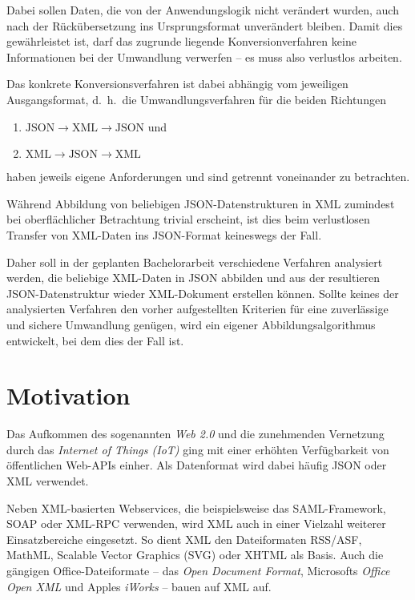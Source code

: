 \documentclass[conference]{template/IEEEtran}
\begin{document}
Dabei sollen Daten, die von der Anwendungslogik nicht verändert wurden, auch
nach der Rückübersetzung ins Ursprungsformat unverändert bleiben. Damit dies
gewährleistet ist, darf das zugrunde liegende Konversionverfahren keine
Informationen bei der Umwandlung verwerfen -- es muss also verlustlos %
arbeiten.

Das konkrete Konversionsverfahren ist dabei abhängig vom jeweiligen
Ausgangsformat, d.~h.\ die Umwandlungsverfahren für die beiden Richtungen
\begin{enumerate}
    \item $\text{JSON} \rightarrow \text{XML} \rightarrow \text{JSON}$ und
    \item $\text{XML} \rightarrow \text{JSON} \rightarrow \text{XML}$
\end{enumerate}
haben jeweils eigene Anforderungen und sind getrennt voneinander zu betrachten.

Während Abbildung von beliebigen JSON-Datenstrukturen in XML zumindest bei
oberflächlicher Betrachtung trivial erscheint, ist dies beim verlustlosen
Transfer von XML-Daten ins JSON-Format keineswegs der Fall.

Daher soll in der geplanten Bachelorarbeit verschiedene Verfahren analysiert
werden, die beliebige XML-Daten in JSON abbilden und aus der resultieren
JSON-Datenstruktur wieder XML-Dokument erstellen können. Sollte keines
der analysierten Verfahren den vorher aufgestellten Kriterien für eine
zuverlässige und sichere Umwandlung genügen, wird ein eigener
Abbildungsalgorithmus entwickelt, bei dem dies der Fall ist.

\section{Motivation}
\label{sec:motivation}
Das Aufkommen des sogenannten \emph{Web 2.0} und die zunehmenden Vernetzung
durch das \emph{Internet of Things (IoT)} ging mit einer erhöhten
Verfügbarkeit von öffentlichen Web-APIs einher. Als Datenformat wird dabei
häufig JSON oder XML verwendet.

Neben XML-basierten Webservices, die beispielsweise das SAML-Framework, SOAP
oder XML-RPC verwenden, wird XML auch in einer Vielzahl weiterer
Einsatzbereiche eingesetzt. So dient XML den Dateiformaten RSS/ASF, MathML,
Scalable Vector Graphics (SVG) oder XHTML als Basis. Auch die gängigen
Office-Dateiformate -- das \emph{Open Document Format}, Microsofts %
\emph{Office Open XML} und Apples \emph{iWorks} -- bauen auf XML auf. %
\end{document}
